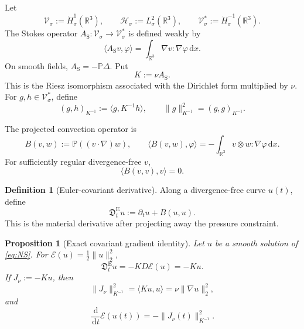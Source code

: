 \documentclass[11pt]{amsart}
\numberwithin{equation}{section}
\theoremstyle{plain}
\newtheorem{proposition}[proposition]{Proposition}
\theoremstyle{definition}
\newtheorem{definition}[definition]{Definition}
\theoremstyle{remark}
\newcommand{\R}{\mathbb R}
\newcommand{\dd}{\,\mathrm d}
\newcommand{\Pdiv}{\mathbb P}
\newcommand{\Energy}{\mathcal E}
\newcommand{\Dcov}{\mathfrak D}
\begin{document}
Let
\[
 \mathcal V_\sigma:=\dot H^1_\sigma(\R^3),
 \qquad
 \mathcal H_\sigma:=L^2_\sigma(\R^3),
 \qquad
 \mathcal V_\sigma^*:=\dot H^{-1}_\sigma(\R^3).
\]
The Stokes operator \(A_{\mathrm S}:\mathcal V_\sigma\to
\mathcal V_\sigma^*\) is defined weakly by
\begin{equation}\label{eq:stokes-operator}
 \langle A_{\mathrm S}v,\varphi\rangle
 =\int_{\R^3}\nabla v:\nabla\varphi\dd x.
\end{equation}
On smooth fields, \(A_{\mathrm S}=-\Pdiv\Delta\).  Put
\begin{equation}\label{eq:mobility}
 K:=\nu A_{\mathrm S}.
\end{equation}
This is the Riesz isomorphism associated with the Dirichlet form multiplied
by \(\nu\).  For \(g,h\in\mathcal V_\sigma^*\), define
\begin{equation}\label{eq:inverse-metric}
 (g,h)_{K^{-1}}:=\langle g,K^{-1}h\rangle,
 \qquad \|g\|_{K^{-1}}^2=(g,g)_{K^{-1}}.
\end{equation}

The projected convection operator is
\begin{equation}\label{eq:B-def}
 B(v,w):=\Pdiv((v\cdot\nabla)w),
 \qquad
 \langle B(v,w),\varphi\rangle
 =-\int_{\R^3}v\otimes w:\nabla\varphi\dd x.
\end{equation}
For sufficiently regular divergence-free \(v\),
\begin{equation}\label{eq:B-skew}
 \langle B(v,v),v\rangle=0.
\end{equation}

\begin{definition}[Euler-covariant derivative]
\label{def:euler-covariant}
Along a divergence-free curve \(u(t)\), define
\begin{equation}\label{eq:euler-covariant}
 \Dcov_t^{\mathrm E}u:=\partial_t u+B(u,u).
\end{equation}
This is the material derivative after projecting away the pressure
constraint.
\end{definition}

\begin{proposition}[Exact covariant gradient identity]
\label{prop:covariant-gradient}
Let \(u\) be a smooth solution of \eqref{eq:NS}.  For
\(\Energy(u)=\tfrac12\|u\|_2^2\),
\begin{equation}\label{eq:covariant-gradient}
 \Dcov_t^{\mathrm E}u=-K D\Energy(u)=-Ku.
\end{equation}
If \(J_\nu:=-Ku\), then
\begin{equation}\label{eq:action-is-dissipation}
 \|J_\nu\|_{K^{-1}}^2
 =\langle Ku,u\rangle
 =\nu\|\nabla u\|_2^2,
\end{equation}
and
\begin{equation}\label{eq:smooth-energy-identity}
 \frac{\dd}{\dd t}\Energy(u(t))
 =-\|J_\nu(t)\|_{K^{-1}}^2.
\end{equation}
\end{proposition}
\end{document}
